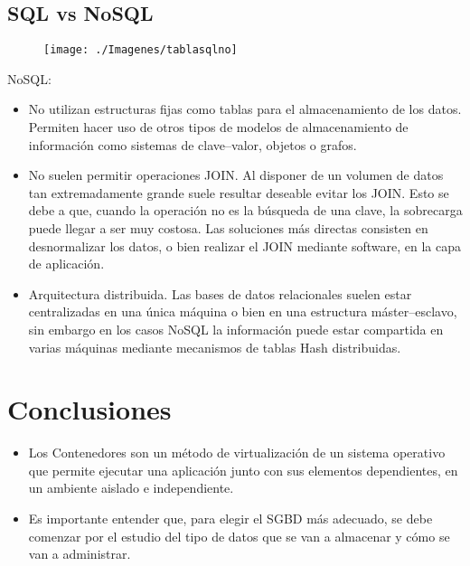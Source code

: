 \documentclass[%
 reprint,
 amsmath,amssymb,
 aps,
]{revtex4-1}
\begin{document}
\subsection{SQL vs NoSQL}
	\begin{figure}[htb]
	\begin{center}
	\texttt{[image: ./Imagenes/tablasqlno]}
	\end{center}
	\end{figure}
	\par NoSQL: 
	\begin{itemize}
	\item No utilizan estructuras fijas como tablas para el almacenamiento de los datos. Permiten hacer uso de otros tipos de modelos de almacenamiento de información como sistemas de clave–valor, objetos o grafos.
	\item No suelen permitir operaciones JOIN. Al disponer de un volumen de datos tan extremadamente grande suele resultar deseable evitar los JOIN. Esto se debe a que, cuando la operación no es la búsqueda de una clave, la sobrecarga puede llegar a ser muy costosa. Las soluciones más directas consisten en desnormalizar los datos, o bien realizar el JOIN mediante software, en la capa de aplicación.
	\item Arquitectura distribuida. Las bases de datos relacionales suelen estar centralizadas en una única máquina o bien en una estructura máster–esclavo, sin embargo en los casos NoSQL la información puede estar compartida en varias máquinas mediante mecanismos de tablas Hash distribuidas.
	\end{itemize}
	\cite{comparison}
	

\section{Conclusiones}\label{sec:6}


\begin{itemize}
	\item Los Contenedores son un método de virtualización de un sistema operativo que permite ejecutar una aplicación junto con sus elementos dependientes, en un ambiente aislado e independiente.
	\item Es importante entender que, para elegir el SGBD más adecuado, se debe comenzar por el estudio del tipo de datos que se van a almacenar y cómo se van a administrar.
\end{itemize}





\end{document}
